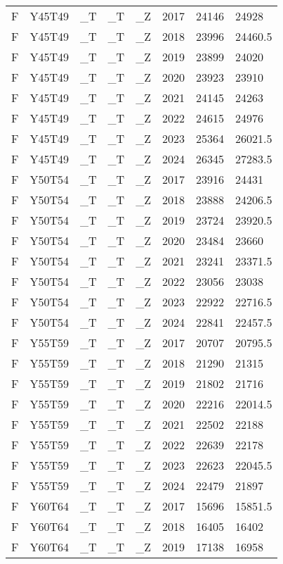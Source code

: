 \begin{longtable}[t]{llllllll}
\addlinespace
F & Y45T49 & \_T & \_T & \_Z & 2017 & 24146 & 24928\\
F & Y45T49 & \_T & \_T & \_Z & 2018 & 23996 & 24460.5\\
F & Y45T49 & \_T & \_T & \_Z & 2019 & 23899 & 24020\\
F & Y45T49 & \_T & \_T & \_Z & 2020 & 23923 & 23910\\
F & Y45T49 & \_T & \_T & \_Z & 2021 & 24145 & 24263\\
\addlinespace
F & Y45T49 & \_T & \_T & \_Z & 2022 & 24615 & 24976\\
F & Y45T49 & \_T & \_T & \_Z & 2023 & 25364 & 26021.5\\
F & Y45T49 & \_T & \_T & \_Z & 2024 & 26345 & 27283.5\\
F & Y50T54 & \_T & \_T & \_Z & 2017 & 23916 & 24431\\
F & Y50T54 & \_T & \_T & \_Z & 2018 & 23888 & 24206.5\\
\addlinespace
F & Y50T54 & \_T & \_T & \_Z & 2019 & 23724 & 23920.5\\
F & Y50T54 & \_T & \_T & \_Z & 2020 & 23484 & 23660\\
F & Y50T54 & \_T & \_T & \_Z & 2021 & 23241 & 23371.5\\
F & Y50T54 & \_T & \_T & \_Z & 2022 & 23056 & 23038\\
F & Y50T54 & \_T & \_T & \_Z & 2023 & 22922 & 22716.5\\
\addlinespace
F & Y50T54 & \_T & \_T & \_Z & 2024 & 22841 & 22457.5\\
F & Y55T59 & \_T & \_T & \_Z & 2017 & 20707 & 20795.5\\
F & Y55T59 & \_T & \_T & \_Z & 2018 & 21290 & 21315\\
F & Y55T59 & \_T & \_T & \_Z & 2019 & 21802 & 21716\\
F & Y55T59 & \_T & \_T & \_Z & 2020 & 22216 & 22014.5\\
\addlinespace
F & Y55T59 & \_T & \_T & \_Z & 2021 & 22502 & 22188\\
F & Y55T59 & \_T & \_T & \_Z & 2022 & 22639 & 22178\\
F & Y55T59 & \_T & \_T & \_Z & 2023 & 22623 & 22045.5\\
F & Y55T59 & \_T & \_T & \_Z & 2024 & 22479 & 21897\\
F & Y60T64 & \_T & \_T & \_Z & 2017 & 15696 & 15851.5\\
\addlinespace
F & Y60T64 & \_T & \_T & \_Z & 2018 & 16405 & 16402\\
F & Y60T64 & \_T & \_T & \_Z & 2019 & 17138 & 16958\\

\end{longtable}
